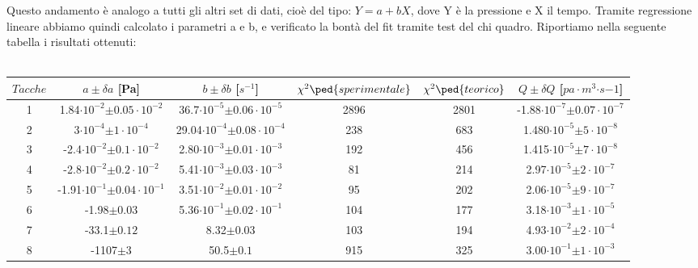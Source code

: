 \documentclass[a4paper,11pt]{article}
\begin{document}
Questo andamento è analogo a tutti gli altri set di dati, cioè del tipo: $Y=a+bX$, dove Y è la pressione e X il tempo. Tramite regressione lineare abbiamo quindi calcolato i parametri a e b, e verificato la bontà del fit tramite test del chi quadro. Riportiamo nella seguente tabella i risultati ottenuti:\\
\vspace{10 px}\\

\hspace{-30 pt}
\begin{tabular}{|c|c|c|c|c|c|}
\hline $Tacche$ & $a\pm$$\delta a$ [Pa] & $b\pm$$\delta b$ [$s^{-1}$] & $\chi^{2}\ped{sperimentale}$ & $\chi^{2}\ped{teorico}$ & $Q\pm\delta Q$ [$pa\cdot m^{3}$$\cdot s{-1}$] \\ 
\hline 1 & 1.84$\cdot10^{-2}$$\pm 0.05\cdot10^{-2}$ &  36.7$\cdot10^{-5}$$\pm 0.06\cdot10^{-5}$ & 2896 & 2801 & -1.88$\cdot10^{-7}$$\pm 0.07\cdot10^{-7}$ \\ 
\hline 2 & 3$\cdot10^{-4}$$\pm 1\cdot10^{-4}$ & 29.04$\cdot10^{-4}$$\pm 0.08\cdot10^{-4}$ & 238 & 683 & 1.480$\cdot10^{-5}$$\pm 5\cdot10^{-8}$ \\ 
\hline 3 & -2.4$\cdot10^{-2}$$\pm 0.1\cdot10^{-2}$ &  2.80$\cdot10^{-3}$$\pm 0.01\cdot10^{-3}$ & 192 & 456 & 1.415$\cdot10^{-5}$$\pm 7\cdot10^{-8}$ \\ 
\hline 4 & -2.8$\cdot10^{-2}$$\pm 0.2\cdot10^{-2}$ &  5.41$\cdot10^{-3}$$\pm 0.03\cdot10^{-3}$ & 81 & 214 & 2.97$\cdot10^{-5}$$\pm 2\cdot10^{-7}$ \\ 
\hline 5 & -1.91$\cdot10^{-1}$$\pm 0.04\cdot10^{-1}$ & 3.51$\cdot10^{-2}$$\pm 0.01\cdot10^{-2}$ & 95 & 202 & 2.06$\cdot10^{-5}$$\pm 9\cdot10^{-7}$ \\ 
\hline 6 & -1.98$\pm 0.03$  & 5.36$\cdot10^{-1}$$\pm 0.02\cdot10^{-1}$ & 104 & 177 & 3.18$\cdot10^{-3}$$\pm 1\cdot10^{-5}$ \\ 
\hline 7 & -33.1$\pm 0.12$ & 8.32$\pm 0.03$ & 103 & 194 & 4.93$\cdot10^{-2}$$\pm 2\cdot10^{-4}$ \\ 
\hline 8 & -1107$\pm 3$ & 50.5$\pm 0.1$  & 915 & 325 & 3.00$\cdot10^{-1}$$\pm 1\cdot10^{-3}$ \\ 
\hline 
\end{tabular} \\
\\
\\
\end{document}
